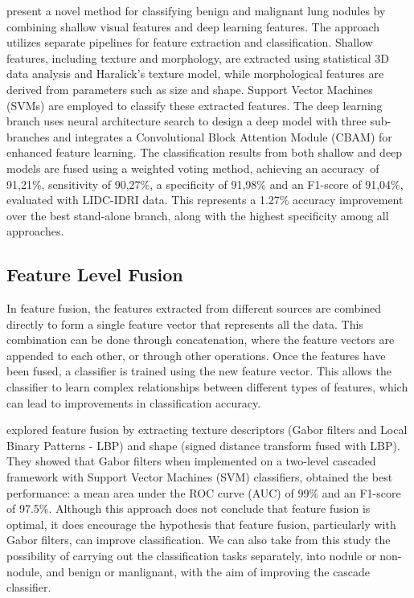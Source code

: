 \citet{liu_classification_2023} present a novel method for classifying benign and malignant lung nodules by combining shallow visual features and deep learning features. The approach utilizes separate pipelines for feature extraction and classification. Shallow features, including texture and morphology, are extracted using statistical 3D data analysis and Haralick's texture model, while morphological features are derived from parameters such as size and shape. Support Vector Machines (SVMs) are employed to classify these extracted features. The deep learning branch uses neural architecture search to design a deep model with three sub-branches and integrates a Convolutional Block Attention Module (CBAM) for enhanced feature learning. The classification results from both shallow and deep models are fused using a weighted voting method, achieving an accuracy\ of 91,21\%, sensitivity of 90,27\%, a specificity of 91,98\% and an F1-score of 91,04\%, evaluated with LIDC-IDRI data. This represents a 1.27\% accuracy improvement over the best stand-alone branch, along with the highest specificity among all approaches. 


\subsection{Feature Level Fusion}
In feature fusion, the features extracted from different sources are combined directly to form a single feature vector that represents all the data.
This combination can be done through concatenation, where the feature vectors are appended to each other, or through other operations.
Once the features have been fused, a classifier is trained using the new feature vector.
This allows the classifier to learn complex relationships between different types of features, which can lead to improvements in classification accuracy.

\citet{farag_feature_2017} explored feature fusion by extracting texture descriptors (Gabor filters and Local Binary Patterns - LBP) and shape (signed distance transform fused with LBP). They showed that Gabor filters when implemented on a two-level cascaded framework with Support Vector Machines (SVM) classifiers, obtained the best performance: a mean area under the ROC curve (AUC) of 99\% and an F1-score of 97.5\%. Although this approach does not conclude that feature fusion is optimal, it does encourage the hypothesis that feature fusion, particularly with Gabor filters, can improve classification. We can also take from this study the possibility of carrying out the classification tasks separately, into nodule or non-nodule, and benign or manlignant, with the aim of improving the cascade classifier.

